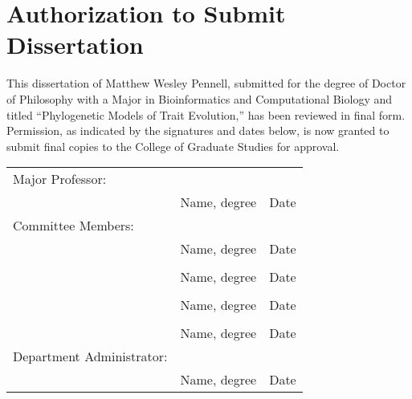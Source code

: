 \chapter*{Authorization to Submit Dissertation}

This dissertation of Matthew Wesley Pennell, submitted for the degree of Doctor of Philosophy with a Major in Bioinformatics and Computational Biology and titled ``Phylogenetic Models of Trait Evolution,'' has been reviewed in final form. Permission, as indicated by the signatures and dates below, is now granted to submit final copies to the College of Graduate Studies for approval.

\vspace{1in}

\begin{center}
\begin{tabular}{ p{}  p{}  p{} }
Major Professor: & \hrulefill & \hrulefill\\[-8pt]
 & Name, degree & Date\\[18pt]
Committee Members: & \hrulefill & \hrulefill\\[-8pt]
 & Name, degree & Date\\[18pt]
 & \hrulefill & \hrulefill\\[-8pt]
 & Name, degree & Date\\[18pt]
& \hrulefill & \hrulefill\\[-8pt]
 & Name, degree & Date\\[18pt]
& \hrulefill & \hrulefill\\[-8pt]
 & Name, degree & Date\\[18pt]
Department Administrator: & \hrulefill & \hrulefill\\[-8pt]
 & Name, degree & Date\\[18pt]
\end{tabular}
\end{center}


 
